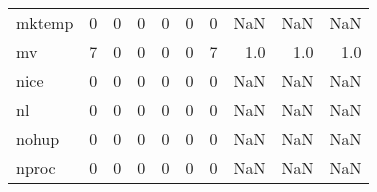 \begin{tabular}{lrrrrrrrrr}
mktemp    &                                                  0 &                                                  0 &                                                  0 &                                                  0 &                                                  0 &                                                  0 &                                                NaN &                                    NaN &                                  NaN \\
mv        &                                                  7 &                                                  0 &                                                  0 &                                                  0 &                                                  0 &                                                  7 &                                                1.0 &                                    1.0 &                                  1.0 \\
nice      &                                                  0 &                                                  0 &                                                  0 &                                                  0 &                                                  0 &                                                  0 &                                                NaN &                                    NaN &                                  NaN \\
nl        &                                                  0 &                                                  0 &                                                  0 &                                                  0 &                                                  0 &                                                  0 &                                                NaN &                                    NaN &                                  NaN \\
nohup     &                                                  0 &                                                  0 &                                                  0 &                                                  0 &                                                  0 &                                                  0 &                                                NaN &                                    NaN &                                  NaN \\
nproc     &                                                  0 &                                                  0 &                                                  0 &                                                  0 &                                                  0 &                                                  0 &                                                NaN &                                    NaN &                                  NaN \\

\end{tabular}
